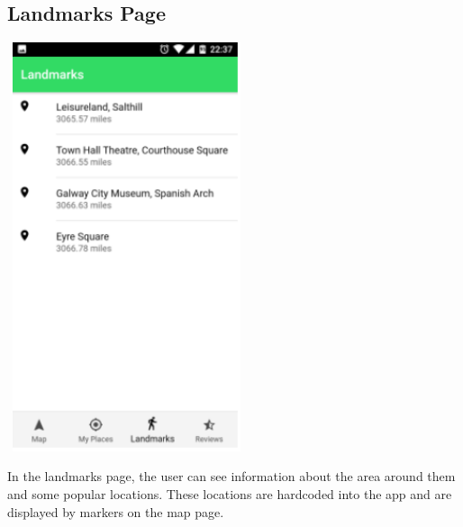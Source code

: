 \subsection{Landmarks Page}
\begin{center}    
	\includegraphics[width=7cm, height=12cm]{img/landmarks.png}
\end{center}

In the landmarks page, the user can see information about the area around them and some popular locations. These locations are hardcoded into the app and are displayed by markers on the map page.

